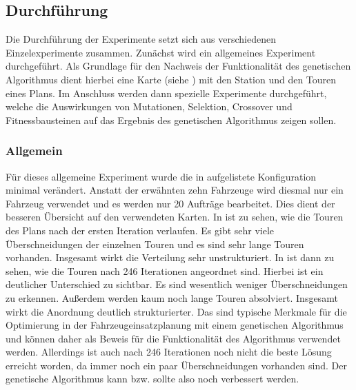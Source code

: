 \subsection{Durchführung}
\label{sec:Durchfuerhung}
Die Durchführung der Experimente setzt sich aus verschiedenen Einzelexperimente zusammen. Zunächst wird ein allgemeines Experiment durchgeführt. Als Grundlage für den Nachweis der Funktionalität des genetischen Algorithmus dient hierbei eine Karte (siehe ) mit den Station und den Touren eines Plans. Im Anschluss werden dann spezielle Experimente durchgeführt, welche die Auswirkungen von Mutationen, Selektion, Crossover und Fitnessbausteinen auf das Ergebnis des genetischen Algorithmus zeigen sollen.

\subsubsection{Allgemein}
\label{sec:Allgemein}
Für dieses allgemeine Experiment wurde die in  aufgelistete Konfiguration minimal verändert. Anstatt der erwähnten zehn Fahrzeuge wird diesmal nur ein Fahrzeug verwendet und es werden nur 20 Aufträge bearbeitet. Dies dient der besseren Übersicht auf den verwendeten Karten. In  ist zu sehen, wie die Touren des Plans nach der ersten Iteration verlaufen. Es gibt sehr viele Überschneidungen der einzelnen Touren und es sind sehr lange Touren vorhanden. Insgesamt wirkt die Verteilung sehr unstrukturiert. In  ist dann zu sehen, wie die Touren nach 246 Iterationen angeordnet sind. Hierbei ist ein deutlicher Unterschied zu  sichtbar. Es sind wesentlich weniger Überschneidungen zu erkennen. Außerdem werden kaum noch lange Touren absolviert. Insgesamt wirkt die Anordnung deutlich strukturierter. Das sind typische Merkmale für die Optimierung in der Fahrzeugeinsatzplanung mit einem genetischen Algorithmus und können daher als Beweis für die Funktionalität des Algorithmus verwendet werden. Allerdings ist auch nach 246 Iterationen noch nicht die beste Lösung erreicht worden, da immer noch ein paar Überschneidungen vorhanden sind. Der genetische Algorithmus kann bzw. sollte also noch verbessert werden.


